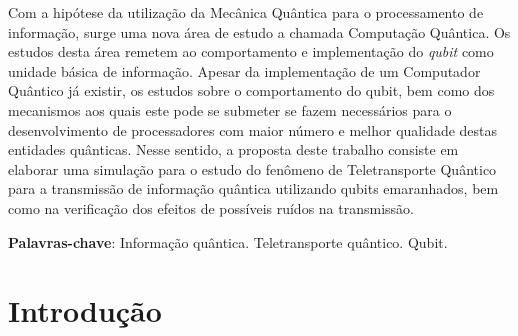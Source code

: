 \documentclass[12pt,oneside,brazil,hidelinks,article,sumario=tradicional,a4paper]{abntex2}
\renewcommand{\imprimircapa}{%
  \begin{capa}%
    \centering
    {\imprimirinstituicao\vfill}

    {\ABNTEXchapterfont\large\imprimirautor}

    \vfill
    {\ABNTEXchapterfont\bfseries\LARGE\imprimirtitulo}
    \vfill

    \large\imprimirlocal

    \large\imprimirdata

    \vspace*{15mm}
  \end{capa}
}
\begin{document}
\pretextual
\imprimircapa

\begin{resumo} 

Com a hipótese da utilização da Mecânica Quântica para o processamento de informação, surge uma nova área de estudo a chamada Computação Quântica. Os estudos desta área remetem ao comportamento e implementação do  \textit{qubit} como unidade básica de informação. Apesar da implementação de um Computador Quântico já existir, os estudos sobre o comportamento do qubit, bem como dos mecanismos aos quais este pode se submeter se fazem necessários para o desenvolvimento de processadores com maior número e melhor qualidade destas entidades quânticas. Nesse sentido, a proposta deste trabalho consiste em elaborar uma simulação para o estudo do fenômeno de Teletransporte Quântico para a transmissão de informação quântica utilizando qubits emaranhados, bem como na verificação dos efeitos de possíveis ruídos na transmissão.


  \vspace{\onelineskip}

  \noindent
  \textbf{Palavras-chave}: Informação quântica. Teletransporte quântico. Qubit.
\end{resumo}
\newpage







 \tableofcontents*
 \clearpage


\textual%

\section{Introdução}\label{sec:intro}
\end{document}
